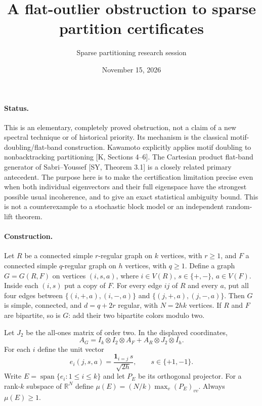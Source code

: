 \documentclass[11pt]{article}
\title{A flat-outlier obstruction to sparse partition certificates}
\author{Sparse partitioning research session}
\date{November 15, 2026}
\newcommand{\R}{\mathbb R}
\newcommand{\one}{\mathbf 1}
\begin{document}
\maketitle

\paragraph{Status.}
This is an elementary, completely proved obstruction, not a claim of a new
spectral technique or of historical priority. Its mechanism is the classical
motif-doubling/flat-band construction. Kawamoto explicitly applies motif
doubling to nonbacktracking partitioning [K, Sections 4--6]. The Cartesian
product flat-band generator of Sabri--Youssef [SY, Theorem 3.1] is a closely
related primary antecedent. The purpose here is to make the certification
limitation precise even when both individual eigenvectors and their full
eigenspace have the strongest possible usual incoherence, and to give an
exact statistical ambiguity bound. This is not a counterexample to a
stochastic block model or an independent random-lift theorem.

\paragraph{Construction.}
Let $R$ be a connected simple $r$-regular graph on $k$ vertices, with
$r\geq1$, and $F$ a connected simple $q$-regular graph on $h$ vertices,
with $q\geq1$. Define a graph $G=G(R,F)$
on vertices $(i,s,a)$, where $i\in V(R)$, $s\in\{+,-\}$, $a\in V(F)$.
Inside each $(i,s)$ put a copy of $F$. For every edge $ij$ of $R$ and every
$a$, put all four edges between $\{(i,+,a),(i,-,a)\}$ and
$\{(j,+,a),(j,-,a)\}$. Then $G$ is simple, connected, and
$d=q+2r$ regular, with $N=2hk$ vertices. If $R$ and $F$ are bipartite, so
is $G$: add their two bipartite colors modulo two.

Let $J_2$ be the all-ones matrix of order two. In the displayed coordinates,
\begin{equation}
 A_G=I_k\otimes I_2\otimes A_F+A_R\otimes J_2\otimes I_h.
 \label{tensor}
\end{equation}
For each $i$ define the unit vector
\[
 e_i(j,s,a)=\frac{\one_{i=j}\,s}{\sqrt{2h}},
 \qquad s\in\{+1,-1\}.
\]
Write $E=\operatorname{span}\{e_i:1\leq i\leq k\}$ and let $P_E$ be its
orthogonal projector. For a rank-$k$ subspace of $\R^N$ define
$\mu(E)=(N/k)\max_v(P_E)_{vv}$. Always $\mu(E)\geq1$.
\end{document}
